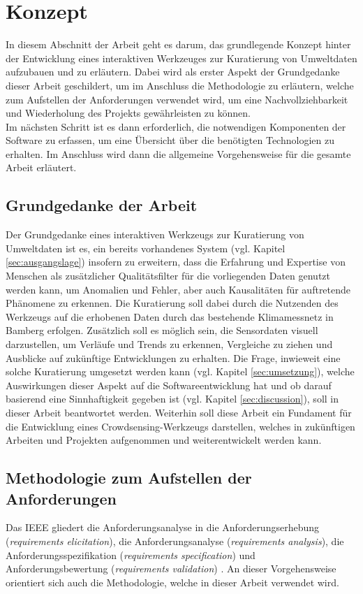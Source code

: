 \chapter{Konzept} %
In diesem Abschnitt der Arbeit geht es darum, das grundlegende Konzept hinter der Entwicklung eines interaktiven Werkzeuges zur Kuratierung von Umweltdaten aufzubauen und zu erläutern. Dabei wird als erster Aspekt der Grundgedanke dieser Arbeit geschildert, um im Anschluss die Methodologie zu erläutern, welche zum Aufstellen der Anforderungen verwendet wird,
um eine Nachvollziehbarkeit und Wiederholung des Projekts gewährleisten zu können. \\ Im nächsten Schritt ist es dann erforderlich, die notwendigen Komponenten der Software zu erfassen, um eine Übersicht über die benötigten Technologien zu erhalten. Im Anschluss wird dann die allgemeine Vorgehensweise für die gesamte Arbeit erläutert.

\section{Grundgedanke der Arbeit}
Der Grundgedanke eines interaktiven Werkzeugs zur Kuratierung von Umweltdaten ist es, ein bereits vorhandenes System (vgl. Kapitel \ref{sec:ausgangslage}) insofern zu erweitern, dass die Erfahrung und Expertise von Menschen als zusätzlicher Qualitätsfilter für die vorliegenden Daten genutzt werden kann, um Anomalien und Fehler, aber auch Kausalitäten für auftretende Phänomene zu erkennen. Die Kuratierung soll dabei durch die Nutzenden des Werkzeugs auf die erhobenen Daten durch das bestehende Klimamessnetz in Bamberg erfolgen. Zusätzlich soll es möglich sein, die Sensordaten visuell darzustellen, um Verläufe und Trends zu erkennen, Vergleiche zu ziehen und Ausblicke auf zukünftige Entwicklungen zu erhalten. Die Frage, inwieweit eine solche Kuratierung umgesetzt werden kann (vgl. Kapitel \ref{sec:umsetzung}), welche Auswirkungen dieser Aspekt auf die Softwareentwicklung hat und ob darauf basierend eine Sinnhaftigkeit gegeben ist (vgl. Kapitel \ref{sec:discussion}), soll in dieser Arbeit beantwortet werden. Weiterhin soll diese Arbeit ein Fundament für die Entwicklung eines Crowdsensing-Werkzeugs darstellen, welches in zukünftigen Arbeiten und Projekten aufgenommen und weiterentwickelt werden kann. 

\section{Methodologie zum Aufstellen der Anforderungen}
\label{sec:methodologyrequirements}
Das \ac{IEEE} gliedert die Anforderungsanalyse in die Anforderungserhebung (\textit{requirements elicitation}), die Anforderungsanalyse (\textit{requirements analysis}), die Anforderungsspezifikation (\textit{requirements specification}) und Anforderungsbewertung (\textit{requirements validation}) \cite{ieee2004}. An dieser Vorgehensweise orientiert sich auch die Methodologie, welche in dieser Arbeit verwendet wird.

